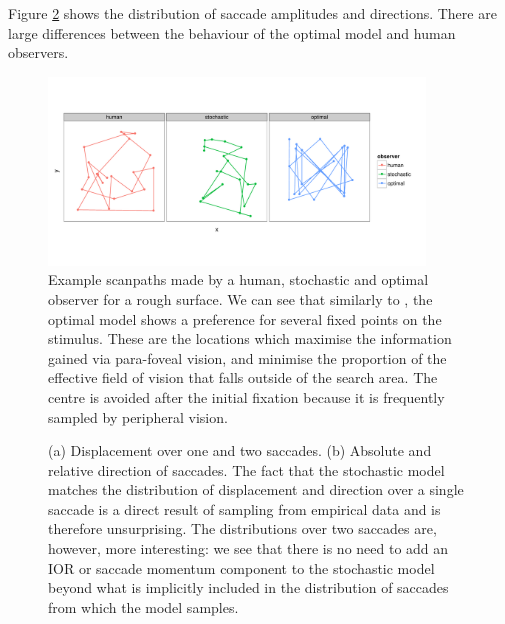 \documentclass[preprint, authoryear]{elsarticle} %
\begin{document}
Figure \ref{fig:onetwostats} shows the distribution of saccade amplitudes and directions. There are large differences between the behaviour of the optimal model and human observers. 

\begin{figure}
	\centering
	\includegraphics[width=10cm]{fig/modelComp/exScanpaths.pdf}
	\caption{Example scanpaths made by a human, stochastic and optimal observer for a rough surface. We can see that similarly to \citet{najemnik-geisler2008}, the optimal model shows a preference for several fixed points on the stimulus. These are the locations which maximise the information gained via para-foveal vision, and minimise the proportion of the effective field of vision that falls outside of the search area. The centre is avoided after the initial fixation because it is frequently sampled by peripheral vision.} 
	\label{fig:exScanpaths}
\end{figure}


\begin{figure}
	\centering
	\caption{(a) Displacement over one and two saccades. (b) Absolute and relative direction of saccades. The fact that the stochastic model matches the distribution of displacement and direction over a single saccade is a direct result of sampling from empirical data and is therefore unsurprising. The distributions over two saccades are, however, more interesting: we see that there is no need to add an IOR or saccade momentum component to the stochastic model beyond what is implicitly included in the distribution of saccades from which the model samples.}
	\label{fig:onetwostats}
\end{figure}
\end{document}
